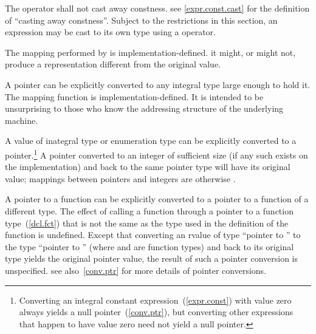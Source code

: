 \pnum
The  operator shall not cast away constness.
\enternote see \ref{expr.const.cast} for the definition of ``casting
away constness''. Subject to the restrictions in this section, an
expression may be cast to its own type using a 
operator. \exitnote

\pnum
The mapping performed by  is implementation-defined.
\enternote it might, or might not, produce a representation
different from the original value.
\exitnote 

\pnum
{}%
%
A pointer can be explicitly converted to any integral type large enough
to hold it.
%
The mapping function is implementa\-tion-defined.
\enternote
It is intended to be unsurprising to those who know the addressing
structure of the underlying machine.
\exitnote

\pnum
{}%
%
A value of inategral type or enumeration type can be explicitly converted
to a pointer.\footnote{Converting an integral constant
expression~(\ref{expr.const}) with value zero always yields a null
pointer~(\ref{conv.ptr}), but converting other expressions that happen to
have value zero need not yield a null pointer.}
A pointer converted to an integer of sufficient size (if
any such exists on the implementation) and back to the same pointer type
will have its original value;
%
mappings between pointers and integers are otherwise
.

\pnum
{}%
%
%
A pointer to a function can be explicitly converted to a pointer
to a function of a different type.
%
The effect of calling a function through a pointer to a function
type~(\ref{dcl.fct}) that is not the same as the type used in the
definition of the function is undefined. Except that converting
an rvalue of type ``pointer to '' to the type ``pointer to
'' (where  and  are function types) and
back to its original type yields the original pointer value, the result
of such a pointer conversion is unspecified.
\enternote 
see also~\ref{conv.ptr} for more details of pointer conversions.
\exitnote 

